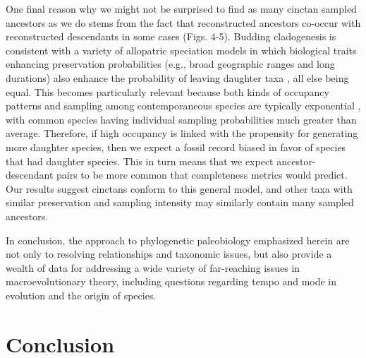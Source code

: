 \documentclass{article}
\begin{document}
One final reason why we might not be surprised to find as many cinctan sampled ancestors as we do stems from the fact that reconstructed ancestors co-occur with reconstructed descendants in some cases (Figs. 4-5).  Budding cladogenesis is consistent with a variety of allopatric speciation models in which biological traits enhancing preservation probabilities (e.g., broad geographic ranges and long durations) also enhance the probability of leaving daughter taxa \citep{WagnerErwin1995}, all else being equal. This becomes particularly relevant because both kinds of occupancy patterns and sampling among contemporaneous species are typically exponential \citep{Liow2013,WagnerMarcot2013,Foote2016}, with common species having individual sampling probabilities much greater than average. Therefore, if high occupancy is linked with the propensity for generating more daughter species, then we expect a fossil record biased in favor of species that had daughter species.  This in turn means that we expect ancestor-descendant pairs to be more common that completeness metrics would predict.  Our results suggest cinctans conform to this general model, and other taxa with similar preservation and sampling intensity may similarly contain many sampled ancestors. 

In conclusion, the approach to phylogenetic paleobiology emphasized herein are not only to resolving relationships and taxonomic issues, but also provide a wealth of data for addressing a wide variety of far-reaching issues in macroevolutionary theory, including questions regarding tempo and mode in evolution and the origin of species.



\section{Conclusion}
\end{document}
